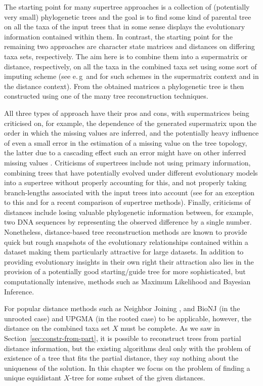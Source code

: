 The starting point for many supertree approaches is a collection of
(potentially very small) phylogenetic trees and the goal is to find some kind
of parental tree on all the taxa of the input trees that in some sense
displays the evolutionary information contained within them.  In contrast, the
starting point for the remaining two approaches are character state matrices
and distances on differing taxa sets, respectively. The aim here is to combine
them into a supermatrix or distance, respectively, on all the taxa in the
combined taxa set using some sort of imputing scheme (see
e.\,g\,\cite{bininda04phylogenetic} and \cite{queiroz06supermatrix} for such
schemes in the supermatrix context and
\cite{guenoche1999approximations,makarenkov2001nouvelle,guenoche2004extension}
in the distance context).  From the obtained matrices a phylogenetic tree is
then constructed using one of the many tree reconstruction techniques.

All three types of approach have their pros and cons, with supermatrices being
criticised on, for example, the dependence of the generated supermatrix upon
the order in which the missing values are inferred, and the potentially heavy
influence of even a small error in the estimation of a missing value on the
tree topology, the latter due to a cascading effect such an error might have
on other inferred missing values \cite{lapointe04everything}.  Criticisms of
supertrees include not using primary information, combining trees that have
potentially evolved under different evolutionary models into a supertree
without properly accounting for this, and not properly taking branch-lengths
associated with the input trees into account (see \cite{willson04constructing}
for an exception to this and \cite{kupczok11consequences} for a recent
comparison of supertree methods).  Finally, criticisms of distances include
losing valuable phylogenetic information between, for example, two DNA
sequences by representing the observed difference by a single number.
Nonetheless, distance-based tree reconstruction methods are known to provide
quick but rough snapshots of the evolutionary relationships contained within a
dataset making them particularly attractive for large datasets. In addition to
providing evolutionary insights in their own right their attraction also lies
in the provision of a potentially good starting/guide tree for more
sophisticated, but computationally intensive, methods such as Maximum
Likelihood and Bayesian Inference.

For popular distance methods such as Neighbor Joining \cite{saitou1987nj}, and
BioNJ \cite{gascuel97bionj} (in the unrooted case) and \textsc{UPGMA}
\cite{sokal1958statistical} (in the rooted case) to be applicable, however,
the distance on the combined taxa set $X$ must be complete.  As we saw in
Section~\ref{sec:constr-from-part}, it is possible to reconstruct trees from
partial distance information, but the existing algorithms deal only with the
problem of existence of a tree that fits the partial distance, they say
nothing about the uniqueness of the solution.  In this chapter we focus on the
problem of finding a unique equidistant $X$-tree for some subset of the given
distances.

